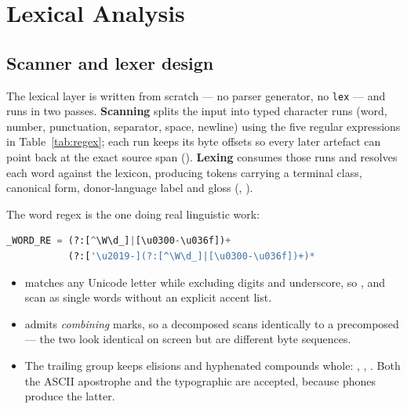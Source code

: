\section{Lexical Analysis}\label{c:lexical}

\subsection{Scanner and lexer design}

The lexical layer is written from scratch --- no parser generator, no \texttt{lex} --- and
runs in two passes. \textbf{Scanning} splits the input into typed character runs (word,
number, punctuation, separator, space, newline) using the five regular expressions in
Table~\ref{tab:regex}; each run keeps its byte offsets so every later artefact can point
back at the exact source span (). \textbf{Lexing} consumes those runs and
resolves each word against the lexicon, producing tokens carrying a terminal class,
canonical form, donor-language label and gloss (, ).



The word regex is the one doing real linguistic work:

\begin{lstlisting}[language=Python, numbers=none, basicstyle=\ttfamily\footnotesize]
_WORD_RE = (?:[^\W\d_]|[\u0300-\u036f])+
           (?:['\u2019-](?:[^\W\d_]|[\u0300-\u036f])+)*
\end{lstlisting}

\begin{itemize}[leftmargin=1.4em, itemsep=0.05em]
  \item {} matches any Unicode letter while
        excluding digits and underscore, so ,  and  scan as single
        words without an explicit accent list.
  \item {} admits \emph{combining} marks,
        so a decomposed  scans identically to a precomposed  --- the two
        look identical on screen but are different byte sequences.
  \item The trailing group keeps elisions and hyphenated compounds whole: ,
        , . Both the ASCII apostrophe and the typographic 
        are accepted, because phones produce the latter.
\end{itemize}

